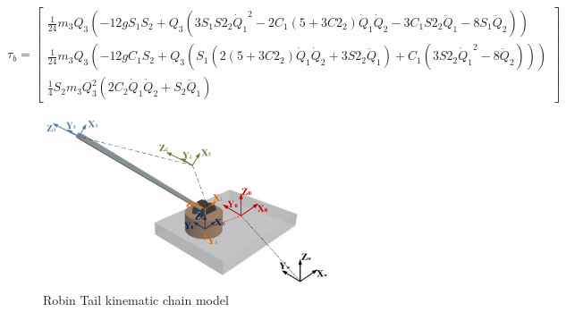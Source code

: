 \tiny
\begin{equation}
\tau_b=\begin{bmatrix}
\frac{1}{24} m_3 Q_3 \left(-12 g S_1 S_2+Q_3 \left(3 S_1 S2_2 {\dot{Q}_1}^2-2 C_1\left(5+3 C2_2\right) \dot{Q}_1 \dot{Q}_2-3 C_1 S2_2 \ddot{Q}_1-8 S_1 \ddot{Q}_2\right)\right)\\
\frac{1}{24} m_3 Q_3 \left(-12 g C_1 S_2+Q_3 \left(S_1\left( 2(5+3C2_2)\dot{Q}_1 \dot{Q}_2+3S2_2\ddot{Q}_1\right)+C_1(3S2_2{\dot{Q}_1}^2-8\ddot{Q}_2)\right)\right)\\
\frac{1}{4} S_2 m_3 Q_3^2 \left(2 C_2 \dot{Q}_1 \dot{Q}_2+S_2 \ddot{Q}_1\right)
\end{bmatrix}
\end{equation}
\normalsize

\begin{figure}
	\centering
	\includegraphics[width=85mm]{./pictures/RobinRepic.pdf}
	\caption{Robin Tail kinematic chain model}
	\label{fig:rmax}
\end{figure}

